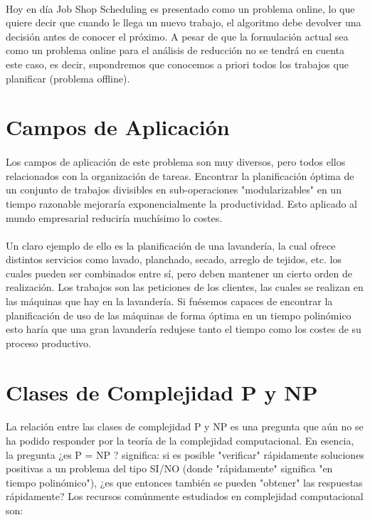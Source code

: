 \documentclass[11pt, a4paper,spanish]{article}
\begin{document}
			\paragraph{}
			Hoy en día Job Shop Scheduling es presentado como un problema online, lo que quiere decir que cuando le llega un nuevo trabajo, el algoritmo debe devolver una decisión antes de conocer el próximo. A pesar de que la formulación actual sea como un problema online para el análisis de reducción no se tendrá en cuenta este caso, es decir, supondremos que conocemos a priori todos los trabajos que planificar (problema offline).
		\section{Campos de Aplicación}
		
			\paragraph{}
			Los campos de aplicación de este problema son muy diversos, pero todos ellos relacionados con la organización de tareas. Encontrar la planificación óptima de un conjunto de trabajos divisibles en sub-operaciones "modularizables" en un tiempo razonable mejoraría exponencialmente la productividad. Esto aplicado al mundo empresarial reduciría muchísimo lo costes.
		
			\paragraph{}
			Un claro ejemplo de ello es la planificación de una lavandería, la cual ofrece distintos servicios como lavado, planchado, secado, arreglo de tejidos, etc. los cuales pueden ser combinados entre sí, pero deben mantener un cierto orden de realización. Los trabajos son las peticiones de los clientes, las cuales se realizan en las máquinas que hay en la lavandería. Si fuésemos capaces de encontrar la planificación de uso de las máquinas de forma óptima en un tiempo polinómico esto haría que una gran lavandería redujese tanto el tiempo como los costes de su proceso productivo.
	
		\section{Clases de Complejidad P y NP}
		
			\paragraph{}
			La relación entre las clases de complejidad P y NP es una pregunta que aún no se ha podido responder por la teoría de la complejidad computacional. En esencia, la pregunta ¿es P = NP ? significa: si es posible "verificar" rápidamente soluciones positivas a un problema del tipo SI/NO (donde "rápidamente" significa "en tiempo polinómico"), ¿es que entonces también se pueden "obtener" las respuestas rápidamente? Los recursos comúnmente estudiados en complejidad computacional son:
\end{document}
